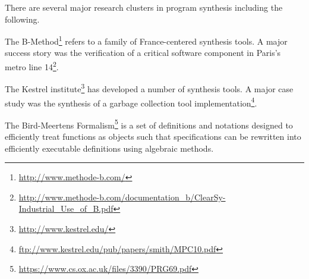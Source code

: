 
There are several major research clusters in program synthesis including the following.

The B-Method\footnote{\url{http://www.methode-b.com/}} refers to a family of France-centered synthesis tools.
A major success story was the verification of a critical software component in Paris's metro line 14\footnote{\url{http://www.methode-b.com/documentation_b/ClearSy-Industrial_Use_of_B.pdf}}.

The Kestrel institute\footnote{\url{http://www.kestrel.edu/}} has developed a number of synthesis tools.
A major case study was the synthesis of a garbage collection tool implementation\footnote{\url{ftp://www.kestrel.edu/pub/papers/smith/MPC10.pdf}}.

The Bird-Meertens Formalism\footnote{\url{https://www.cs.ox.ac.uk/files/3390/PRG69.pdf}} is a set of definitions and notations designed to efficiently treat functions as objects such that specifications can be rewritten into efficiently executable definitions using algebraic methods.

